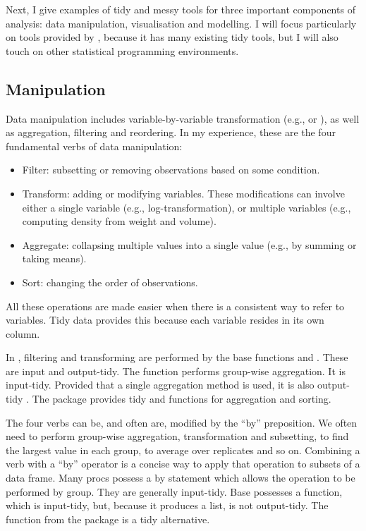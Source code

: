 \documentclass[article]{jss}
\begin{document}
Next, I give examples of tidy and messy tools for three important components of analysis: data manipulation, visualisation and modelling. I will focus particularly on tools provided by  \citep{R}, because it has many existing tidy tools, but I will also touch on other statistical programming environments.

\subsection{Manipulation}

Data manipulation includes variable-by-variable transformation (e.g.,  or ), as well as aggregation, filtering and reordering. In my experience, these are the four fundamental verbs of data manipulation:

\begin{itemize}

  \item Filter: subsetting or removing observations based on some
  condition.

  \item Transform: adding or modifying variables. These modifications can
  involve either a single variable (e.g., log-transformation), or multiple 
  variables (e.g., computing density from weight and volume).

  \item Aggregate: collapsing multiple values into a single value (e.g., by 
  summing or taking means).

  \item Sort: changing the order of observations.

\end{itemize}

All these operations are made easier when there is a consistent way to refer to variables. Tidy data provides this because each variable resides in its own column.

In , filtering and transforming are performed by the base  functions  and . These are input and output-tidy. The  function performs group-wise aggregation. It is input-tidy. Provided that a single aggregation method is used, it is also output-tidy . The  package provides tidy  and  functions for aggregation and sorting.

The four verbs can be, and often are, modified by the ``by'' preposition. We often need to perform group-wise aggregation, transformation and subsetting, to find the largest value in each group, to average over replicates and so on. Combining a verb with a ``by'' operator is a concise way to apply that operation to subsets of a data frame. Many  {\sc proc}s possess a {\sc by} statement which allows the operation to be performed by group. They are generally input-tidy. Base  possesses a  function, which is input-tidy, but, because it produces a list, is not output-tidy. The  function from the  package is a tidy alternative.
\end{document}
